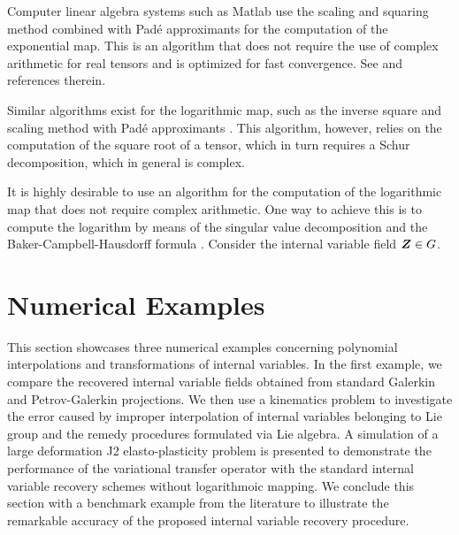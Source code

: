 \documentclass[12pt]{article}
\begin{document}
Computer linear algebra systems such as Matlab use the scaling and
squaring method combined with Pad\'{e} approximants for the
computation of the exponential map. This is an algorithm that does not
require the use of complex arithmetic for real tensors and is
optimized for fast convergence. See \citep{Higham:2005} and
references therein.

Similar algorithms exist for the logarithmic map, such as the inverse
square and scaling method with Pad\'{e} approximants
\citep{Higham:2001}. This algorithm, however, relies on the
computation of the square root of a tensor, which in turn requires a
Schur decomposition, which in general is complex.

It is highly desirable to use an algorithm for the computation of the
logarithmic map that does not require complex arithmetic. One way to
achieve this is to compute the logarithm by means of the singular
value decomposition and the Baker-Campbell-Hausdorff formula
\citep{Kosmann-Schwarzbach:2009}. Consider the internal variable field
${\boldsymbol{Z}} \in G$.

\section{Numerical Examples}
This section showcases three numerical examples concerning polynomial
interpolations and transformations of internal variables. In the first
example, we compare the recovered internal variable fields obtained
from standard Galerkin and Petrov-Galerkin projections. We then use a
kinematics problem to investigate the error caused by improper
interpolation of internal variables belonging to Lie group and the
remedy procedures formulated via Lie algebra. A simulation of a large
deformation J2 elasto-plasticity problem is presented to demonstrate 
the performance of the variational transfer operator  with the 
standard internal variable recovery schemes without logarithmoic mapping. 
We conclude this section with a benchmark
example from the literature to illustrate the remarkable accuracy of
the proposed internal variable recovery procedure.
\end{document}
